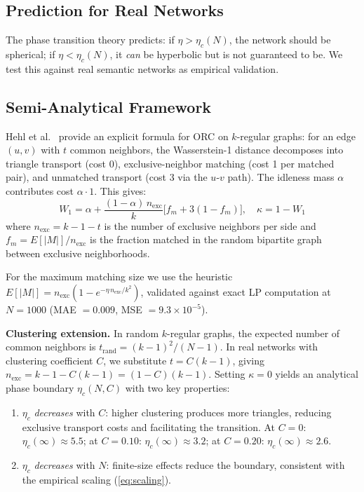 \documentclass[11pt,a4paper]{article}
\newcommand{\etac}{\eta_c}
\begin{document}
\subsection{Prediction for Real Networks}

The phase transition theory predicts: if $\eta > \etac(N)$, the network should be spherical; if $\eta < \etac(N)$, it \emph{can} be hyperbolic but is not guaranteed to be. We test this against real semantic networks as empirical validation.

\subsection{Semi-Analytical Framework}
\label{sec:analytical}

Hehl et al.~\cite{hehl2024curvature} provide an explicit formula for ORC on $k$-regular graphs: for an edge $(u,v)$ with $t$ common neighbors, the Wasserstein-1 distance decomposes into triangle transport (cost 0), exclusive-neighbor matching (cost 1 per matched pair), and unmatched transport (cost 3 via the $u$-$v$ path). The idleness mass $\alpha$ contributes cost $\alpha \cdot 1$. This gives:
\begin{equation}
    W_1 = \alpha + \frac{(1-\alpha)\,n_{\mathrm{exc}}}{k}\bigl[f_m + 3(1 - f_m)\bigr], \quad \kappa = 1 - W_1
    \label{eq:hehl}
\end{equation}
where $n_{\mathrm{exc}} = k - 1 - t$ is the number of exclusive neighbors per side and $f_m = E[|M|]/n_{\mathrm{exc}}$ is the fraction matched in the random bipartite graph between exclusive neighborhoods.

For the maximum matching size we use the heuristic $E[|M|] = n_{\mathrm{exc}}(1 - e^{-\eta\,n_{\mathrm{exc}}/k^2})$, validated against exact LP computation at $N = 1000$ (MAE $= 0.009$, MSE $= 9.3 \times 10^{-5}$).

\textbf{Clustering extension.} In random $k$-regular graphs, the expected number of common neighbors is $t_{\mathrm{rand}} = (k-1)^2/(N-1)$. In real networks with clustering coefficient $C$, we substitute $t = C(k-1)$, giving $n_{\mathrm{exc}} = k - 1 - C(k-1) = (1-C)(k-1)$. Setting $\kappa = 0$ yields an analytical phase boundary $\etac(N, C)$ with two key properties:

\begin{enumerate}
    \item $\etac$ \emph{decreases} with $C$: higher clustering produces more triangles, reducing exclusive transport costs and facilitating the transition. At $C = 0$: $\etac(\infty) \approx 5.5$; at $C = 0.10$: $\etac(\infty) \approx 3.2$; at $C = 0.20$: $\etac(\infty) \approx 2.6$.
    \item $\etac$ \emph{decreases} with $N$: finite-size effects reduce the boundary, consistent with the empirical scaling (\ref{eq:scaling}).
\end{enumerate}
\end{document}
